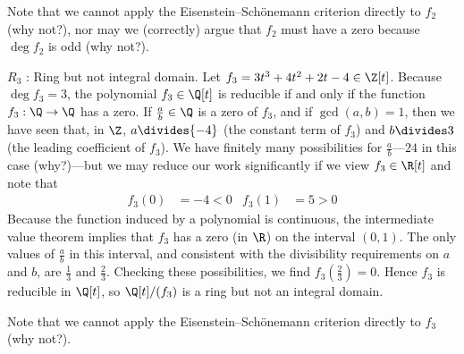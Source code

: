 {Note that we cannot apply the Eisenstein--Sch\"{o}nemann criterion directly to $f_{2}$ (why not?), nor may we (correctly) argue that $f_{2}$ must have a zero because $\deg f_{2}$ is odd (why not?).

$R_{3}$ : Ring but not integral domain. Let $f_{3} = 3 t^{3} + 4 t^{2} + 2 t - 4 \in \Z[t]$. Because $\deg f_{3} = 3$, the polynomial $f_{3} \in \Q[t]$ is reducible if and only if the function $f_{3} : \Q \rightarrow \Q$ has a zero. If $\frac{a}{b} \in \Q$ is a zero of $f_{3}$, and if $\gcd(a, b) = 1$, then we have seen that, in $\Z$, $a \divides {-4}$ (the constant term of $f_{3}$) and $b \divides 3$ (the leading coefficient of $f_{3}$). We have finitely many possibilities for $\frac{a}{b}$---$24$ in this case (why?)---but we may reduce our work significantly if we view $f_{3} \in \R[t]$ and note that
\begin{align*}
f_{3}(0) &= -4 < 0
&
f_{3}(1) &= 5 > 0
\end{align*}
Because the function induced by a polynomial is continuous, the intermediate value theorem implies that $f_{3}$ has a zero (in $\R$) on the interval $(0,1)$. The only values of $\frac{a}{b}$ in this interval, and consistent with the divisibility requirements on $a$ and $b$, are $\frac{1}{3}$ and $\frac{2}{3}$. Checking these possibilities, we find $f_{3}(\frac{2}{3}) = 0$. Hence $f_{3}$ is reducible in $\Q[t]$, so $\Q[t] / (f_{3})$ is a ring but not an integral domain.

Note that we cannot apply the Eisenstein--Sch\"{o}nemann criterion directly to $f_{3}$ (why not?).}%